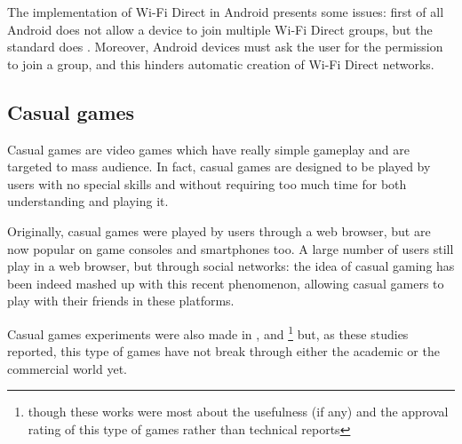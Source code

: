 The implementation of Wi-Fi Direct in Android presents some issues: first of all
Android does not allow a device to join multiple Wi-Fi Direct groups,
but the standard does \cite{bib:android-wifidirect-limits}. Moreover, Android devices must ask the user for the
permission to join a group, and this hinders automatic creation of Wi-Fi Direct
networks.

\subsection{Casual games}
Casual games are video games which have really simple gameplay and are
targeted to mass audience. In fact, casual games are designed to be played
by users with no special skills and without requiring too much time for both
understanding and playing it.

Originally, casual games were played by users through a web browser, but are
now popular on game consoles and smartphones too. A large number of users still
play in a web browser, but through social networks: the idea of casual gaming
has been indeed mashed up with this recent phenomenon, allowing casual gamers to
play with their friends in these platforms.

Casual games experiments were also made in \cite{bib:ppav-casual},
\cite{bib:li-k-social-casual} and \cite{bib:mob-health-casual}\footnote{though
these works were most about the usefulness (if any) and the approval rating of
this type of games rather than technical reports} but, as these studies
reported, this type of games have not break through either the academic or the
commercial world yet.
